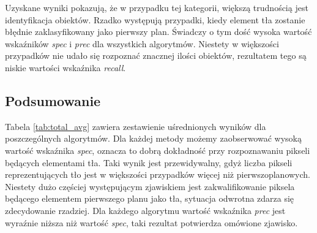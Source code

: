Uzyskane wyniki pokazują, że w przypadku tej kategorii, większą trudnością jest identyfikacja obiektów. Rzadko występują przypadki, kiedy element tła zostanie błędnie zaklasyfikowany jako pierwszy plan. Świadczy o tym dość wysoka wartość wskaźników \textit{spec} i \textit{prec} dla wszystkich algorytmów. Niestety w większości przypadków nie udało się rozpoznać znacznej ilości obiektów, rezultatem tego są niskie wartości wskaźnika \textit{recall}. 

\subsection{Podsumowanie}
\label{subsec:testy_podsumowanie}

Tabela \ref{tab:total_avg} zawiera zestawienie uśrednionych wyników dla poszczególnych algorytmów. Dla każdej metody możemy zaobserwować wysoką wartość wskaźnika \textit{spec}, oznacza to dobrą dokładność przy rozpoznawaniu pikseli będących elementami tła. Taki wynik jest przewidywalny, gdyż liczba pikseli reprezentujących tło jest w większości przypadków więcej niż pierwszoplanowych. Niestety dużo częściej występującym zjawiskiem jest zakwalifikowanie piksela będącego elementem pierwszego planu jako tła, sytuacja odwrotna zdarza się zdecydowanie rzadziej. Dla każdego algorytmu wartość wskaźnika \textit{prec} jest wyraźnie niższa niż wartość \textit{spec}, taki rezultat potwierdza omówione zjawisko. 

